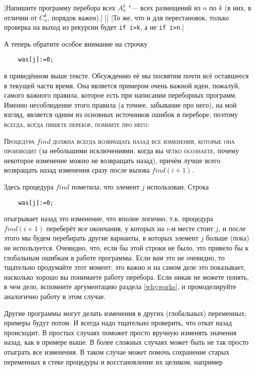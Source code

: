 |Напишите программу перебора всех $A_n^k$ "--- всех 
размещений из $n$ по $k$ (в них, в отличии от $C_n^k$, порядок важен).|
||
|То же, что и для перестановок, только проверка на выход из рекурсии будет \texttt{if i>k}, а не 
\texttt{if i>n}.|


А теперь обратите особое внимание на строчку
\begin{codesampleo}\begin{verbatim}
    was[j]:=0;
\end{verbatim}
\end{codesampleo}
в приведённом выше тексте. Обсуждению её мы посвятим почти всё оставшееся в
текущей части время. Она является примером очень важной идеи, пожалуй, самого важного
правила, которое есть при написании переборных программ. Именно несоблюдение
этого правила (а точнее, забывание про него), на мой взгляд, является одним из
основных источников ошибок в переборе, поэтому \textsc{всегда, когда пишете перебор,
помните про него}:

\textsc{Процедура $find$ должна всегда возвращать назад все изменения, которые она 
производит} (за небольшими исключениями, когда вы \textsc{чётко осознаете}, почему 
некоторое изменение можно не возвращать назад), причём лучше всего возвращать 
назад изменения сразу после вызова $find(i+1)$.


Здесь процедура $find$ пометила, что элемент $j$ использован. Строка 
\begin{codesampleo}\begin{verbatim}
    was[j]:=0;
\end{verbatim}
\end{codesampleo}
отыгрывает назад это изменение, что вполне логично, т.к. процедура $find(i+1)$ 
переберёт все окончания, у которых на $i$-м месте стоит $j$, и после этого мы будем 
перебирать другие варианты, в которых элемент $j$ больше (пока) не используется.
Очевидно, что, если бы этой строки не было, это привело бы к 
глобальным ошибкам в работе программы. Если вам это не очевидно, то тщательно продумайте этот 
момент; это важно и на самом деле это показывает, насколько хорошо вы понимаете работу перебора. 
Если никак не можете понять, в чем дело, вспомните аргументацию раздела \ref{whyworks}, 
и промоделируйте аналогично работу в этом случае.

Другие программы могут делать изменения в других (глобальных) переменных; 
примеры будут потом. И всегда надо тщательно проверить, что откат назад 
происходит. В простых случаях поможет просто вручную изменять значения назад, 
как в примере выше. В более сложных случаях может быть не так просто отыграть 
все изменения. В таком случае может помочь сохранение старых переменных в стеке 
процедуры и восстановление их целиком, например

